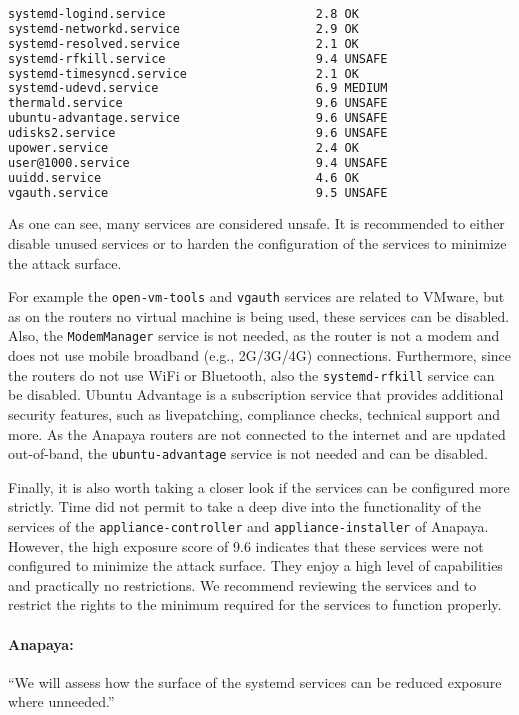 \begin{lstlisting}[language=bash, deletekeywords={local}, numbers=none, caption={Output of \texttt{systemd-analyze security} on the device in Thun running Anapaya's system version v2.8.0.}]
systemd-logind.service                     2.8 OK        
systemd-networkd.service                   2.9 OK        
systemd-resolved.service                   2.1 OK        
systemd-rfkill.service                     9.4 UNSAFE    
systemd-timesyncd.service                  2.1 OK        
systemd-udevd.service                      6.9 MEDIUM    
thermald.service                           9.6 UNSAFE    
ubuntu-advantage.service                   9.6 UNSAFE    
udisks2.service                            9.6 UNSAFE    
upower.service                             2.4 OK        
user@1000.service                          9.4 UNSAFE    
uuidd.service                              4.6 OK        
vgauth.service                             9.5 UNSAFE    
\end{lstlisting}

As one can see, many services are considered unsafe.
It is recommended to either disable unused services or to harden the configuration of the services to minimize the attack surface.

For example the \texttt{open-vm-tools} and \texttt{vgauth} services are related to VMware, but as on the routers no virtual machine is being used, these services can be disabled.
Also, the \texttt{ModemManager} service is not needed, as the router is not a modem and does not use mobile broadband (e.g., 2G/3G/4G) connections.
Furthermore, since the routers do not use WiFi or Bluetooth, also the \texttt{systemd-rfkill} service can be disabled.
Ubuntu Advantage is a subscription service that provides additional security features, such as livepatching, compliance checks, technical support and more.
As the Anapaya routers are not connected to the internet and are updated out-of-band, the \texttt{ubuntu-advantage} service is not needed and can be disabled.

Finally, it is also worth taking a closer look if the services can be configured more strictly.
Time did not permit to take a deep dive into the functionality of the services of the \texttt{appliance-controller} and \texttt{appliance-installer} of Anapaya.
However, the high exposure score of 9.6 indicates that these services were not configured to minimize the attack surface.
They enjoy a high level of capabilities and practically no restrictions.
We recommend reviewing the services and to restrict the rights to the minimum required for the services to function properly.

\begin{boxH}
\paragraph{Anapaya:}
``We will assess how the surface of the systemd services can be reduced exposure where unneeded.''
\end{boxH}

